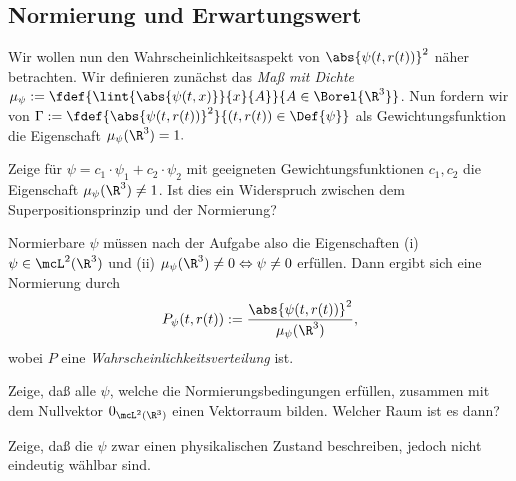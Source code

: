 \documentclass{subfiles}
\begin{document}
    \subsection{Normierung und Erwartungswert}
        Wir wollen nun den Wahrscheinlichkeitsaspekt von $\abs{\psi(t,r(t))}^2$ näher betrachten. Wir definieren zunächst das \emph{Maß mit Dichte} $\mu_\psi:=\fdef{\lint{\abs{\psi(t,x)}}{x}{A}}{A\in\Borel{\R^3}}$. Nun fordern wir von $\Gamma:=\fdef{\abs{\psi(t,r(t))}^2}{(t,r(t))\in\Def{\psi}}$ als Gewichtungsfunktion die Eigenschaft $\mu_\psi(\R^3) = 1.$ 
        \begin{Aufgabe}
            \nr{} Zeige für $\psi = c_1\cdot\psi_1 + c_2\cdot\psi_2$ mit geeigneten Gewichtungsfunktionen $c_1,c_2$ die Eigenschaft $\mu_\psi(\R^3)\neq 1$. Ist dies ein Widerspruch zwischen dem Superpositionsprinzip und der Normierung?
        \end{Aufgabe}
        Normierbare $\psi$ müssen nach der Aufgabe also die Eigenschaften (i) $\psi\in\mcL^2(\R^3)$ und (ii) $\mu_\psi(\R^3)\neq 0\Leftrightarrow \psi\neq 0$ erfüllen. Dann ergibt sich eine Normierung durch
        \[P_\psi(t,r(t)):=\frac{\abs{\psi(t,r(t))}^2}{\mu_\psi(\R^3)},\]
        wobei $P$ eine \emph{Wahrscheinlichkeitsverteilung} ist. 
        \begin{Aufgabe}
            \nr{} Zeige, daß alle $\psi$, welche die Normierungsbedingungen erfüllen, zusammen mit dem Nullvektor $0_{\mcL^2(\R^3)}$ einen Vektorraum bilden. Welcher Raum ist es dann?

            \nr{} Zeige, daß die $\psi$ zwar einen physikalischen Zustand beschreiben, jedoch nicht eindeutig wählbar sind. 
        \end{Aufgabe}
\end{document}
